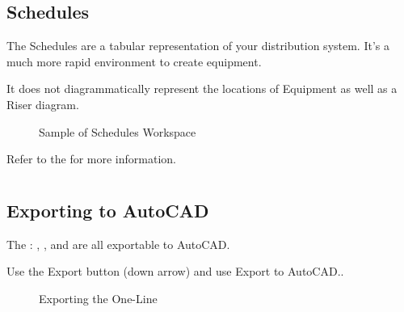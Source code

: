 \documentclass[letterpaper,10pt,english]{sphinxmanual}
\begin{document}
\subsection{Schedules}
\label{\detokenize{docs/tutorial/index-tutorial:schedules}}
The Schedules are a tabular representation of your distribution system.  It’s a much more rapid environment to create equipment.

It does not diagrammatically represent the locations of Equipment as well as a Riser diagram.

\begin{figure}[H]
\centering
\capstart

\noindent{}
\caption{Sample of Schedules Workspace}\label{\detokenize{docs/tutorial/index-tutorial:id23}}\end{figure}

Refer to the {\hyperref[\detokenize{docs/userguide/buildingelectricalmodel/schedules/index-schedules:schedules}]{}} for more information.


\section{}
\label{\detokenize{docs/tutorial/index-tutorial:exporting-studies-and-reporting}}

\subsection{Exporting to AutoCAD}
\label{\detokenize{docs/tutorial/index-tutorial:exporting-to-autocad}}
The {\hyperref[\detokenize{docs/userguide/index-user_guide:electrical-workspaces}]{}}: {\hyperref[\detokenize{docs/userguide/buildingelectricalmodel/one-line/index-one-line:one-line}]{}}, {\hyperref[\detokenize{docs/userguide/buildingelectricalmodel/riser/index-riser:riser}]{}}, and {\hyperref[\detokenize{docs/userguide/buildingelectricalmodel/schedules/index-schedules:schedules}]{}} are all exportable to AutoCAD.

Use the Export button (down arrow) and use Export to AutoCAD..

\begin{figure}[H]
\centering
\capstart

\noindent{}
\caption{Exporting the One-Line}\label{\detokenize{docs/tutorial/index-tutorial:id24}}\end{figure}
\end{document}
